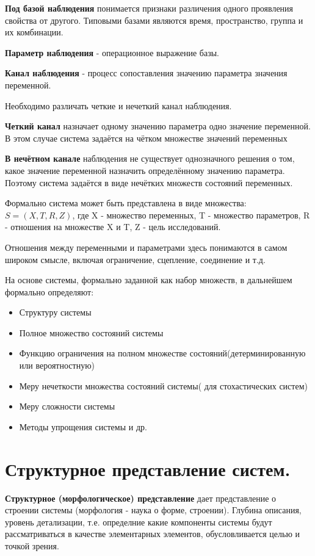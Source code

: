 \documentclass[a4paper]{article}
\begin{document}
	\textbf{Под базой наблюдения} понимается признаки различения одного проявления свойства от другого. Типовыми базами являются время, пространство, группа и их комбинации.
	
	\textbf{Параметр наблюдения} - операционное выражение базы.
	
	\textbf{Канал наблюдения} - процесс сопоставления значению параметра значения переменной.
	
	Необходимо различать четкие и нечеткий канал наблюдения.
	
	\textbf{Четкий канал} назначает одному значению параметра одно значение переменной. В этом случае система задаётся на чётком множестве значений переменных
	
	\textbf{В нечётном канале} наблюдения не существует однозначного решения о том, какое значение переменной назначить определённому значению параметра. Поэтому система задаётся в виде нечётких множеств состояний переменных.
	
	Формально система может быть представлена в виде множества: $ S = (X, T, R, Z) $, где X - множество переменных, T - множество параметров, R - отношения на множестве X и  T, Z - цель исследований.
	
	Отношения между переменными и параметрами здесь понимаются в самом широком смысле, включая ограничение, сцепление, соединение и т.д.
	
	На основе системы, формально заданной как набор множеств, в дальнейшем формально определяют:
	\begin{itemize}
		\item Структуру системы
		\item Полное множество состояний системы
		\item Функцию ограничения на полном множестве состояний(детерминированную или вероятностную)
		\item Меру нечеткости множества состояний системы( для стохастических систем)
		\item Меру сложности системы
		\item Методы упрощения системы и др.
	\end{itemize}

	\section{Структурное представление систем.}
	
	\textbf{Структурное (морфологическое) представление} дает представление о строении системы (морфология - наука о форме, строении). Глубина описания, уровень детализации, т.е. определние какие компоненты системы будут рассматриваться в качестве элементарных элементов, обусловливается целью и точкой зрения. 
	
\end{document}
